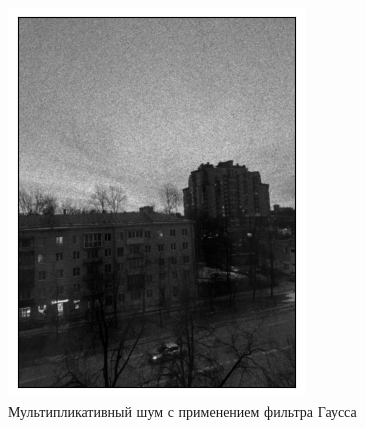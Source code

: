 \documentclass[a4paper,12pt]{article}
\begin{document}
\begin{figure}[H]
\begin{minipage}{0.49\textwidth}
        \centering \includegraphics[width=\textwidth]{results/lpf_speckle_5.png}
        \caption{Мультипликативный шум с применением фильтра Гаусса}
    \end{minipage}
\end{figure}
\end{document}
